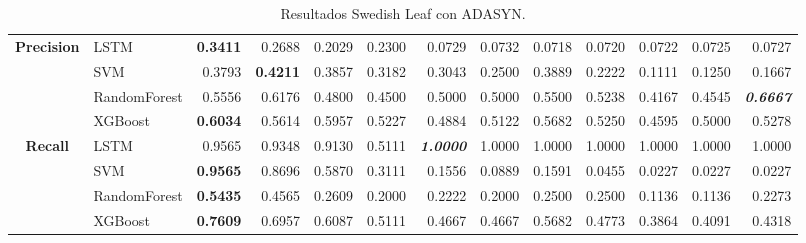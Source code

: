\begin{table}[H]
\begin{adjustbox}{max width=14cm}
\begin{tabular}{|c|l|r|r|r|r|r|r|r|r|r|r|r|}
		\hline
		\textbf{Precision} &  LSTM & \textbf{  0.3411 } &  0.2688 &  0.2029 &  0.2300 &  0.0729 &  0.0732 &  0.0718 &  0.0720 &  0.0722 &  0.0725 &  0.0727 \\
		&  SVM &  0.3793 & \textbf{  0.4211 } &  0.3857 &  0.3182 &  0.3043 &  0.2500 &  0.3889 &  0.2222 &  0.1111 &  0.1250 &  0.1667 \\
		&  RandomForest &  0.5556 &  0.6176 &  0.4800 &  0.4500 &  0.5000 &  0.5000 &  0.5500 &  0.5238 &  0.4167 &  0.4545 & \textit{ \textbf{  0.6667 } } \\
		&  XGBoost & \textbf{  0.6034 } &  0.5614 &  0.5957 &  0.5227 &  0.4884 &  0.5122 &  0.5682 &  0.5250 &  0.4595 &  0.5000 &  0.5278 \\
		\hline
		\textbf{Recall} &  LSTM &  0.9565 &  0.9348 &  0.9130 &  0.5111 & \textit{ \textbf{  1.0000 } } &  1.0000 &  1.0000 &  1.0000 &  1.0000 &  1.0000 &  1.0000 \\
		&  SVM & \textbf{  0.9565 } &  0.8696 &  0.5870 &  0.3111 &  0.1556 &  0.0889 &  0.1591 &  0.0455 &  0.0227 &  0.0227 &  0.0227 \\
		&  RandomForest & \textbf{  0.5435 } &  0.4565 &  0.2609 &  0.2000 &  0.2222 &  0.2000 &  0.2500 &  0.2500 &  0.1136 &  0.1136 &  0.2273 \\
		&  XGBoost & \textbf{  0.7609 } &  0.6957 &  0.6087 &  0.5111 &  0.4667 &  0.4667 &  0.5682 &  0.4773 &  0.3864 &  0.4091 &  0.4318 \\
		\hline
	\end{tabular}
\end{adjustbox}
\caption{Resultados Swedish Leaf con ADASYN.}
\label{tab:SLeaf_ADASYN}
\end{table}

